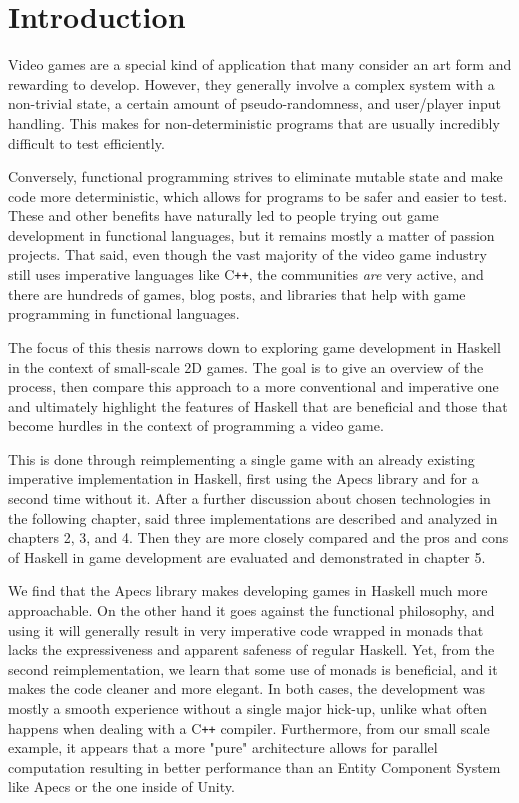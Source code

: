 \documentclass[
  digital, %
  table,   %
  twoside, %
  lof,     %
  lot,     %
]{fithesis3}
\newcommand{\cpp}{C\nolinebreak\texttt{+}\nolinebreak\texttt{+}}
\begin{document}
\chapter*{Introduction}

Video games are a special kind of application that many consider an art form
and rewarding to develop. However, they generally involve a complex system
with a non-trivial state, a certain amount of pseudo-randomness,
and user/player input handling. This makes for non-deterministic
programs that are usually incredibly difficult to test efficiently.

Conversely, functional programming strives to eliminate
mutable state and make code more deterministic, which allows for
programs to be safer and easier to test.
These and other benefits have naturally led to people
trying out game development in functional languages, but
it remains mostly a matter of passion projects.
That said, even though the vast majority of the video game industry
still uses imperative languages like \cpp{}, the communities
\emph{are} very active, and there are hundreds of games,
blog posts, and libraries that help with
game programming in functional languages.

The focus of this thesis narrows down to exploring game development
in Haskell in the context of small-scale 2D games. The goal is
to give an overview of the process, then compare this approach
to a more conventional and imperative one
and ultimately highlight the features of Haskell that are beneficial
and those that become hurdles in the context of programming a video game.

This is done through reimplementing a single game with an already existing
imperative implementation in Haskell,
first using the Apecs library
and for a second time without it. After a further discussion
about chosen technologies in the following chapter,
said three implementations are described and analyzed
in chapters 2, 3, and 4. Then they are more closely compared
and the pros and cons of Haskell in game development are
evaluated and demonstrated in chapter 5.

We find that the Apecs library makes developing games
in Haskell much more approachable. On the other hand
it goes against the functional philosophy, and using it
will generally result in very imperative code wrapped in monads
that lacks the expressiveness and apparent safeness of regular Haskell.
Yet, from the second reimplementation, we learn that
some use of monads is beneficial, and it makes the code cleaner
and more elegant. In both cases, the development was
mostly a smooth experience without a single major hick-up,
unlike what often happens when dealing with a \cpp{} compiler.
Furthermore, from our small scale example,
it appears that a more "pure" architecture allows for parallel
computation resulting in better performance
than an Entity Component System like Apecs or the one
inside of Unity\footnotemark.
\end{document}
